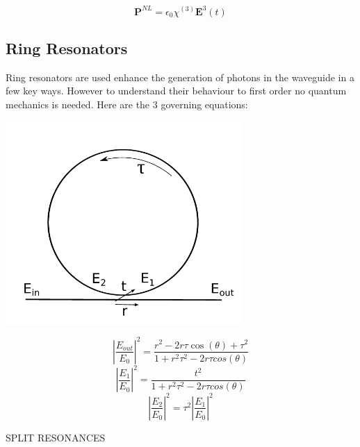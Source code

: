 \begin{equation}
\mathbf{P}^{NL} = \epsilon_0\chi^{(3)}\mathbf{E}^3(t)
\end{equation}

\subsection{Ring Resonators}
Ring resonators are used enhance the generation of photons in the waveguide in a few key ways. However to understand their behaviour to first order no quantum mechanics is needed. Here are the 3 governing equations:

\begingroup
\centering
    \includegraphics[width=9cm]{img/theory/ring.pdf}
\endgroup

\begin{equation}
\left |\frac{E_{out}}{E_{0}}\right|^2=\frac{r^2-2r\tau\cos(\theta)+\tau^2}{1+r^2\tau^2-2r\tau cos(\theta)}
\end{equation}
\begin{equation}
\left|\frac{E_{1}}{E_{0}}\right |^2=\frac{t^2}{1+r^2\tau^2-2r\tau cos(\theta)}
\end{equation}
\begin{equation}
\left |\frac{E_{2}}{E_{0}}\right |^2=\tau^2\left|\frac{E_{1}}{E_{0}}\right |^2
\end{equation}

SPLIT RESONANCES

